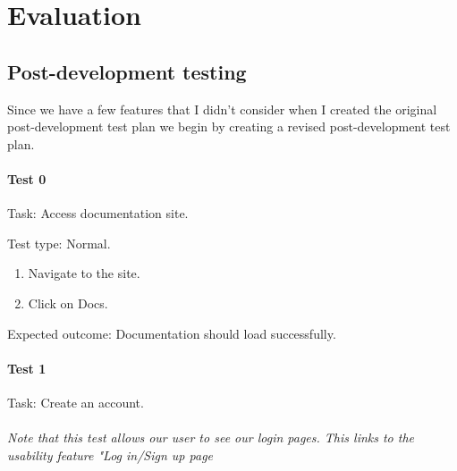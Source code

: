 \pagestyle{fancy} 
\chead{\mdseries \thepage}

\chapter{Evaluation}
\label{chap:evaluation}

\section{Post-development testing}

Since we have a few features that I didn't consider when I created the original post-development test plan we begin
by creating a revised post-development test plan.

\subsubsection{Test 0}

{\sffamily Task:} Access documentation site. \\

{\color{gray} \hrulefill}

{\sffamily Test type: Normal.}

\begin{enumerate}
  \item Navigate to the site.
  \item Click on Docs.
\end{enumerate}

{\sffamily Expected outcome:} Documentation should load successfully. \\

{\color{gray} \hrulefill}

\subsubsection{Test 1}

{\sffamily Task:} Create an account.\\

{\color{gray} \hrulefill} \\

{\textit{Note that this test allows our user to see our login pages. This links to the usability feature
"Log in/Sign up page}}
\\ \vspace{0.2cm}

